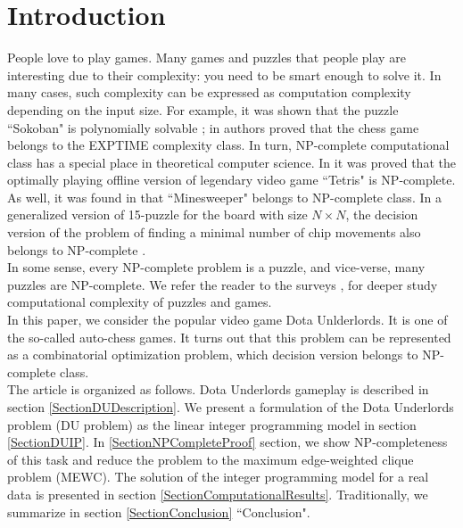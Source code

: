 \documentclass[smallextended]{svjour3}       %
\begin{document}
\section{Introduction}
People love to play games. Many games and puzzles that people play are interesting due to their complexity: you need to be smart enough to solve it. In many cases, such complexity can be expressed as computation complexity depending on the input size. For example, it was shown that the puzzle ``Sokoban" is polynomially solvable \cite{hearn2005pspace}; in \cite{fraenkel1981computing} authors proved that the chess game belongs to the EXPTIME complexity class.
In turn, NP-complete computational class has a special place in theoretical computer science.
In \cite{breukelaar2004tetris} it was proved that the optimally playing offline version of legendary video game ``Tetris" is NP-complete. As well, it was found in \cite{kaye2000minesweeper} that ``Minesweeper" belongs to NP-complete class. In a generalized version of 15-puzzle for the board with size $N \times N$, the decision version of the problem of finding a minimal number of chip movements also belongs to NP-complete \cite{ratner1986finding}.\\
In some sense, every NP-complete problem is a puzzle, and vice-verse, many puzzles are NP-complete. We refer the reader to the surveys \cite{costa2018computational}, \cite{kendall2008survey} for deeper study computational complexity of puzzles and games.\\
In this paper, we consider the popular video game Dota Unlderlords. It is one of the so-called auto-chess games. It turns out that this problem can be represented as a combinatorial optimization problem, which decision version belongs to NP-complete class.\\
The article is organized as follows. Dota Underlords gameplay is described in section \ref{SectionDUDescription}.
We present a formulation of the Dota Underlords problem (DU problem) as the linear integer programming model in section \ref{SectionDUIP}. In \ref{SectionNPCompleteProof} section, we show NP-completeness of this task and reduce the problem to the maximum edge-weighted clique problem (MEWC). The solution of the integer programming model for a real data is presented in section \ref{SectionComputationalResults}. Traditionally, we summarize in section \ref{SectionConclusion} ``Conclusion".
\end{document}
